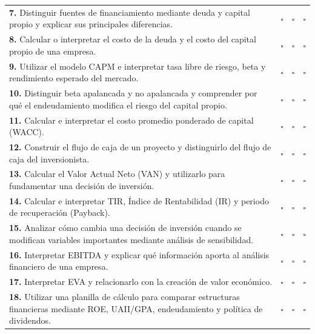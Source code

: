 \documentclass[10pt]{article}
\begin{document}
\begin{table}[H]
\begin{tabularx}{\textwidth}{
    >{\raggedright\arraybackslash}X
    >{\centering\arraybackslash}p{1.8cm}
    >{\centering\arraybackslash}p{1.8cm}
    >{\centering\arraybackslash}p{1.8cm}
}
\textbf{{7.}} Distinguir fuentes de financiamiento mediante deuda y capital propio y explicar sus principales diferencias.
& $\square$ & $\square$ & $\square$ \\

\textbf{{8.}} Calcular o interpretar el costo de la deuda y el costo del capital propio de una empresa.
& $\square$ & $\square$ & $\square$ \\

\textbf{{9.}} Utilizar el modelo CAPM e interpretar tasa libre de riesgo, beta y rendimiento esperado del mercado.
& $\square$ & $\square$ & $\square$ \\

\textbf{{10.}} Distinguir beta apalancada y no apalancada y comprender por qué el endeudamiento modifica el riesgo del capital propio.
& $\square$ & $\square$ & $\square$ \\

\textbf{{11.}} Calcular e interpretar el costo promedio ponderado de capital (WACC).
& $\square$ & $\square$ & $\square$ \\

\textbf{{12.}} Construir el flujo de caja de un proyecto y distinguirlo del flujo de caja del inversionista.
& $\square$ & $\square$ & $\square$ \\

\textbf{{13.}} Calcular el Valor Actual Neto (VAN) y utilizarlo para fundamentar una decisión de inversión.
& $\square$ & $\square$ & $\square$ \\

\textbf{{14.}} Calcular e interpretar TIR, Índice de Rentabilidad (IR) y periodo de recuperación (Payback).
& $\square$ & $\square$ & $\square$ \\

\textbf{{15.}} Analizar cómo cambia una decisión de inversión cuando se modifican variables importantes mediante análisis de sensibilidad.
& $\square$ & $\square$ & $\square$ \\

\textbf{{16.}} Interpretar EBITDA y explicar qué información aporta al análisis financiero de una empresa.
& $\square$ & $\square$ & $\square$ \\

\textbf{{17.}} Interpretar EVA y relacionarlo con la creación de valor económico.
& $\square$ & $\square$ & $\square$ \\

\textbf{{18.}} Utilizar una planilla de cálculo para comparar estructuras financieras mediante ROE, UAII/GPA, endeudamiento y política de dividendos.
& $\square$ & $\square$ & $\square$ \\

\bottomrule
\end{tabularx}
\end{table}
\end{document}
